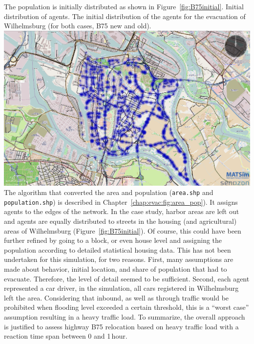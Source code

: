 The population is initially distributed as shown in Figure~\ref{fig:B75initial}. 
%
\createfigure%
{Initial distribution of agents.}%
{The initial distribution of the agents for the evacuation of Wilhelmsburg (for both cases, B75 new and old).}%
{\label{fig:B75initial}}%
{\includegraphics[width=0.7\linewidth]{scenarios/figures/B75initial}}%
{}
The algorithm that converted the area and population (\ie \lstinline|area.shp| and \lstinline|population.shp|) is described in Chapter~\ref{chap:evac:fig:area_pop}). It assigns agents to the edges of the network. In the case study, harbor areas are left out and agents are equally distributed to streets in the housing (and agricultural) areas of Wilhelmsburg (Figure~\ref{fig:B75initial}).
Of course, this could have been further refined by going to a block, or even house level and assigning the population according to detailed statistical housing data. This has not been undertaken for this simulation, for two reasons. First, many assumptions are made about behavior, initial location, and share of population that had to evacuate. Therefore, the level of detail seemed to be sufficient. Second, each agent represented a car driver, \ie in the simulation, all cars registered in Wilhelmsburg left the area. Considering that inbound, as well as through traffic would be prohibited when flooding level exceeded a certain threshold, this is a ``worst case'' assumption resulting in a heavy traffic load. To summarize, the overall approach is justified to assess highway B75 relocation based on heavy traffic load with a reaction time span between 0 and 1\,hour.

